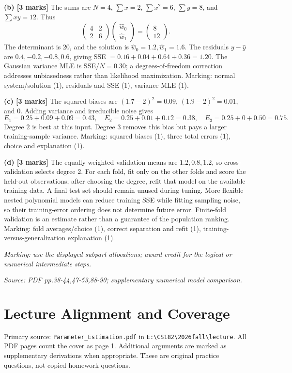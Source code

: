 \documentclass[11pt,a4paper]{article}
\begin{document}
\textbf{(b) [3 marks]} The sums are \(N=4\), \(\sum x=2\), \(\sum x^2=6\), \(\sum y=8\), and \(\sum xy=12\). Thus
\[
\begin{pmatrix}4&2\\2&6\end{pmatrix}
\begin{pmatrix}\hat w_0\\\hat w_1\end{pmatrix}
=\begin{pmatrix}8\\12\end{pmatrix}.
\]
The determinant is 20, and the solution is \(\hat w_0=1.2,\hat w_1=1.6\). The residuals \(y-\hat y\) are \(0.4,-0.2,-0.8,0.6\), giving SSE \(=0.16+0.04+0.64+0.36=1.20\). The Gaussian variance MLE is SSE/\(N=0.30\); a degrees-of-freedom correction addresses unbiasedness rather than likelihood maximization. Marking: normal system/solution (1), residuals and SSE (1), variance MLE (1).

\textbf{(c) [3 marks]} The squared biases are \((1.7-2)^2=0.09\), \((1.9-2)^2=0.01\), and 0. Adding variance and irreducible noise gives
\[
E_1=0.25+0.09+0.09=0.43,\quad
E_2=0.25+0.01+0.12=0.38,\quad
E_3=0.25+0+0.50=0.75.
\]
Degree 2 is best at this input. Degree 3 removes this bias but pays a larger training-sample variance. Marking: squared biases (1), three total errors (1), choice and explanation (1).

\textbf{(d) [3 marks]} The equally weighted validation means are \(1.2,0.8,1.2\), so cross-validation selects degree 2. For each fold, fit only on the other folds and score the held-out observations; after choosing the degree, refit that model on the available training data. A final test set should remain unused during tuning. More flexible nested polynomial models can reduce training SSE while fitting sampling noise, so their training-error ordering does not determine future error. Finite-fold validation is an estimate rather than a guarantee of the population ranking. Marking: fold averages/choice (1), correct separation and refit (1), training-versus-generalization explanation (1).

\textit{Marking: use the displayed subpart allocations; award credit for the logical or numerical intermediate steps.}\par
{\footnotesize\textit{Source: PDF pp.38-44,47-53,88-90; supplementary numerical model comparison.}}
\newpage\section*{Lecture Alignment and Coverage}
Primary source: \texttt{Parameter\_Estimation.pdf} in \texttt{E:\textbackslash CS182\textbackslash 2026fall\textbackslash lecture}. All PDF pages count the cover as page 1. Additional arguments are marked as supplementary derivations when appropriate. These are original practice questions, not copied homework questions.
\end{document}
